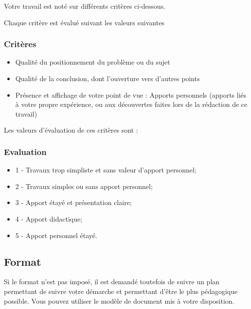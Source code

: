 
Votre travail est noté sur différents critères ci-dessous.

Chaque critère est évalué suivant les valeurs suivantes

\begin{frame}
\frametitle<presentation>{Critères}

\begin{itemize}
  \item Qualité du positionnement du problème ou du sujet
  \item Qualité de la conclusion, dont l'ouverture vers d'autres points
  \item Présence et affichage de votre point de vue : Apports personnels (apports liés à votre propre expérience, ou aux découvertes  faites lors de la rédaction de ce travail)
\end{itemize}

\end{frame}
Les valeurs d'évaluation de ces critères sont :

\begin{frame}
\frametitle<presentation>{Evaluation}

\begin{itemize}
  \item 1 - Travaux trop simpliste et sans valeur d'apport personnel;
  \item 2 - Travaux simples ou sans apport personnel;
  \item 3 - Apport étayé et présentation claire;
  \item 4 - Apport didactique;
  \item 5 - Apport personnel étayé.
\end{itemize}
\end{frame}

\subsection{Format}

Si le format n'est pas imposé, il est demandé toutefois de suivre un plan permettant de suivre votre démarche et permettant d'être le plus pédagogique possible.
Vous pouvez utiliser le modèle de document mis à votre disposition.

